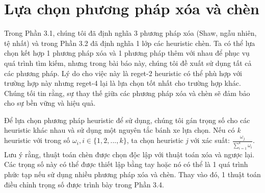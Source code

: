 \section{Lựa chọn phương pháp xóa và chèn}
Trong Phần 3.1, chúng tôi đã định nghĩa 3 phương pháp xóa (Shaw, ngẫu nhiên, tệ nhất) và trong Phần 3.2 đã định nghĩa 1 lớp các heuristic chèn. Ta có thể lựa chọn kết hợp 1 phương pháp xóa và 1 phương pháp thêm với nhau để phục vụ quá trình tìm kiếm, nhưng trong bài báo này, chúng tôi đề xuất sử dụng tất cả các phương pháp. Lý do cho việc này là reget-2 heuristic có thể phù hợp với trường hợp này nhưng reget-4 lại là lựa chọn tốt nhất cho trường hợp khác. Chúng tối tin rằng, sự thay thế giữa các phương pháp xóa và chèn sẽ đảm bảo cho sự bền vững và hiệu quả.

Để lựa chọn phương pháp heuristic để sử dụng, chúng tôi gán trọng số cho các heuristic khác nhau và sử dụng một nguyên tắc bánh xe lựa chọn. Nếu có \textit{k} heuristic với trong số $\omega_i, i \in \{1,2,...,k\}$, ta chọn heuristic \textit{j} với xác suất: $\frac{\omega_j}{\sum_{i=1}^k \omega_i}$. Lưu ý rằng, thuật toán chèn được chọn độc lập với thuật toán xóa và ngược lại. Các trọng số này có thể được thiết lập bằng tay hoặc nó có thể là 1 quá trình phức tạp nếu sử dụng nhiều phương pháp xóa và chèn. Thay vào đó, 1 thuật toán điều chỉnh trọng số được trình bày trong Phần 3.4.
